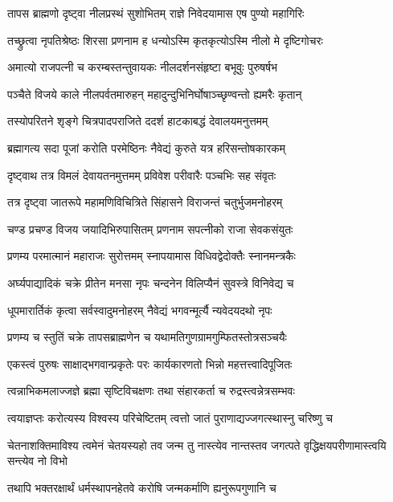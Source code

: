 \twolineshloka
{तापस ब्राह्मणो दृष्ट्वा नीलप्रस्थं सुशोभितम्}
{राज्ञे निवेदयामास एष पुण्यो महागिरिः}%

\twolineshloka
{तच्छ्रुत्वा नृपतिश्रेष्ठः शिरसा प्रणनाम ह}
{धन्योऽस्मि कृतकृत्योऽस्मि नीलो मे दृष्टिगोचरः}%

\twolineshloka
{अमात्यो राजपत्नी च करम्बस्तन्तुवायकः}
{नीलदर्शनसंहृष्टा बभूवुः पुरुषर्षभ}%

\twolineshloka
{पञ्चैते विजये काले नीलपर्वतमारुहन्}
{महादुन्दुभिनिर्घोषाञ्च्छृण्वन्तो ह्यमरैः कृतान्}%

\twolineshloka
{तस्योपरितने शृङ्गे चित्रपादपराजिते}
{ददर्श हाटकाबद्धं देवालयमनुत्तमम्}%

\twolineshloka
{ब्रह्मागत्य सदा पूजां करोति परमेष्ठिनः}
{नैवेद्यं कुरुते यत्र हरिसन्तोषकारकम्}%

\twolineshloka
{दृष्ट्वाथ तत्र विमलं देवायतनमुत्तमम्}
{प्रविवेश परीवारैः पञ्चभिः सह संवृतः}%

\twolineshloka
{तत्र दृष्ट्वा जातरूपे महामणिविचित्रिते}
{सिंहासने विराजन्तं चतुर्भुजमनोहरम्}%

\twolineshloka
{चण्ड प्रचण्ड विजय जयादिभिरुपासितम्}
{प्रणनाम सपत्नीको राजा सेवकसंयुतः}%

\twolineshloka
{प्रणम्य परमात्मानं महाराजः सुरोत्तमम्}
{स्नापयामास विधिवद्वेदोक्तैः स्नानमन्त्रकैः}%

\twolineshloka
{अर्घ्यपाद्यादिकं चक्रे प्रीतेन मनसा नृपः}
{चन्दनेन विलिप्यैनं सुवस्त्रे विनिवेद्य च}%

\twolineshloka
{धूपमारार्तिकं कृत्वा सर्वस्वादुमनोहरम्}
{नैवेद्यं भगवन्मूर्त्यै न्यवेदयदथो नृपः}%

\twolineshloka
{प्रणम्य च स्तुतिं चक्रे तापसब्राह्मणेन च}
{यथामतिगुणग्रामगुम्फितस्तोत्रसञ्चयैः}%


\twolineshloka
{एकस्त्वं पुरुषः साक्षाद्भगवान्प्रकृतेः परः}
{कार्यकारणतो भिन्नो महत्तत्त्वादिपूजितः}%

\twolineshloka
{त्वन्नाभिकमलाज्जज्ञे ब्रह्मा सृष्टिविचक्षणः}
{तथा संहारकर्ता च रुद्रस्त्वन्नेत्रसम्भवः}%

\twolineshloka
{त्वयाज्ञप्तः करोत्यस्य विश्वस्य परिचेष्टितम्}
{त्वत्तो जातं पुराणाद्यज्जगत्स्थास्नु चरिष्णु च}%


\threelineshloka
{चेतनाशक्तिमाविश्य त्वमेनं चेतयस्यहो}
{तव जन्म तु नास्त्येव नान्तस्तव जगत्पते}
{वृद्धिक्षयपरीणामास्त्वयि सन्त्येव नो विभो}%

\twolineshloka
{तथापि भक्तरक्षार्थं धर्मस्थापनहेतवे}
{करोषि जन्मकर्माणि ह्यनुरूपगुणानि च}%

